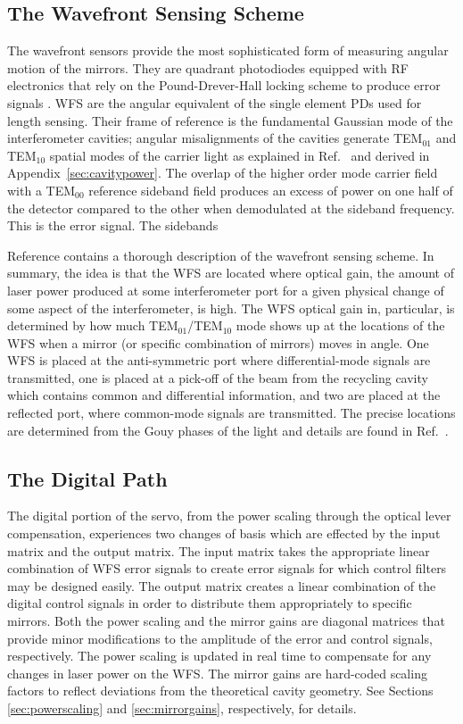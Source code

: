 \subsection{The Wavefront Sensing Scheme}
\label{sec:WFSsensing}
The wavefront sensors provide the most sophisticated form of measuring angular motion of the mirrors. They are quadrant photodiodes equipped with RF electronics that rely on the Pound-Drever-Hall locking scheme to produce error signals \cite{Sigg1996Wavefront}. WFS are the angular equivalent of the single element PDs used for length sensing. Their frame of reference is the fundamental Gaussian mode of the interferometer cavities; angular misalignments of the cavities generate TEM$_{01}$ and TEM$_{10}$ spatial modes of the carrier light as explained in Ref.~\cite{Anderson1984Alignment} and derived in Appendix~\ref{sec:cavitypower}. The overlap of the higher order mode carrier field with a TEM$_{00}$ reference sideband field produces an excess of power on one half of the detector compared to the other when demodulated at the sideband frequency. This is the error signal. The sidebands 

Reference \cite{Fritschel1998Alignment} contains a thorough description of the wavefront sensing scheme. In summary, the idea is that the WFS are located where optical gain, the amount of laser power produced at some interferometer port for a given physical change of some aspect of the interferometer, is high. The WFS optical gain in, particular, is determined by how much TEM$_{01}$/TEM$_{10}$ mode shows up at the locations of the WFS when a mirror (or specific combination of mirrors) moves in angle. One WFS is placed at the anti-symmetric port where differential-mode signals are transmitted, one is placed at a pick-off of the beam from the recycling cavity which contains common and differential information, and two are placed at the reflected port, where common-mode signals are transmitted. The precise locations are determined from the Gouy phases of the light and details are found in Ref.~\cite{Barsotti2009Modeling}.



\subsection{The Digital Path}
The digital portion of the servo, from the power scaling through the optical lever compensation, experiences two changes of basis which are effected by the input matrix and the output matrix. The input matrix takes the appropriate linear combination of WFS error signals to create error signals for which control filters may be designed easily. The output matrix creates a linear combination of the digital control signals in order to distribute them appropriately to specific mirrors. Both the power scaling and the mirror gains are diagonal matrices that provide minor modifications to the amplitude of the error and control signals, respectively. The power scaling is updated in real time to compensate for any changes in laser power on the WFS. The mirror gains are hard-coded scaling factors to reflect deviations from the theoretical cavity geometry. See Sections \ref{sec:powerscaling} and \ref{sec:mirrorgains}, respectively, for details.




